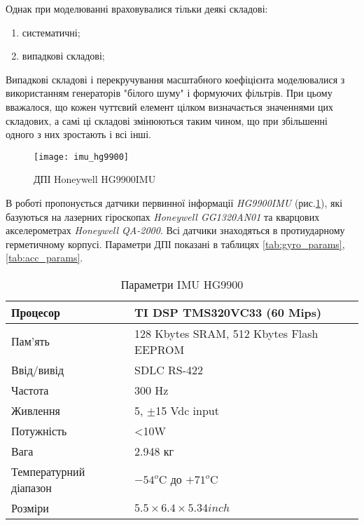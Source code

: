 Однак при моделюванні враховувалися тільки деякі складові:
\begin{enumerate}
  \item систематичні;
  \item випадкові складові;
\end{enumerate}

Випадкові складові і перекручування масштабного коефіцієнта моделювалися 
з використанням генераторів "білого шуму" і формуючих фільтрів. При цьому 
вважалося, що кожен чуттєвий елемент цілком визначається значеннями цих 
складових, а самі ці складові змінюються таким чином, що при збільшенні 
одного з них зростають і всі інші. 

\begin{figure}[here]
\centering
\texttt{[image: imu\_hg9900]}
\caption{ДПІ Honeywell HG9900IMU}
\label{fig:imu_hg9900}
\end{figure} 

В роботі пропонується датчики первинної інформації \textit{HG9900IMU} (рис.\ref{fig:imu_hg9900}),
які базуються на лазерних гіроскопах \textit{Honeywell GG1320AN01} та кварцових акселерометрах \textit{Honeywell QA-2000}. Всі датчики знаходяться в протиударному герметичному корпусі. Параметри ДПІ показані в таблицях \ref{tab:gyro_params},\ref{tab:acc_params}.

\begin{table}[H]
\centering
\caption{Параметри IMU HG9900}

\begin{tabular}{|p{60mm}|p{70mm}|} \hline

Процесор & TI DSP TMS320VC33 (60 Mips) \\ \hline 
Пам’ять & 128 Kbytes SRAM, 512 Kbytes Flash EEPROM \\ \hline 
Ввід/вивід & SDLC RS-422 \\ \hline 
Частота & 300 Hz  \\ \hline 
Живлення & 5, $\pm$15 Vdc input \\ \hline 
Потужність& <10W \\ \hline 
Вага & 2.948 кг  \\ \hline 
Температурний діапазон & $-54^{o}$C до $+71^{o}$C  \\ \hline
Розміри & $5.5\times6.4\times5.34 inch$\\ \hline 
\end{tabular}
\label{tab:imu_params}
\end{table}


